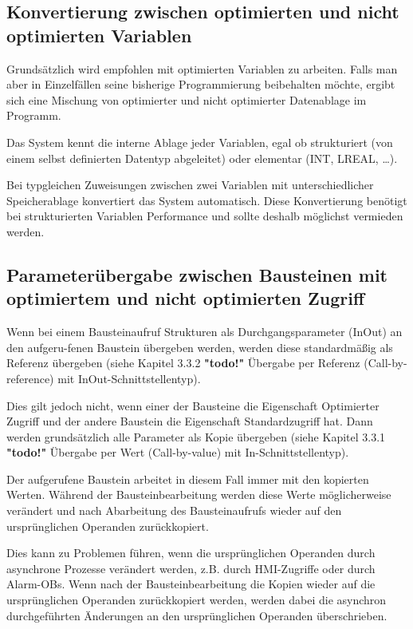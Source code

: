 \subsection{Konvertierung zwischen optimierten und nicht optimierten Variablen}\label{subsec:Konvertierung zwischen optimierten und nicht optimierten Variablen}
Grundsätzlich wird empfohlen mit optimierten Variablen zu arbeiten. Falls man aber in Einzelfällen seine bisherige Programmierung beibehalten möchte, ergibt sich eine Mischung von optimierter und nicht optimierter Datenablage im Programm. \par
Das System kennt die interne Ablage jeder Variablen, egal ob strukturiert (von einem selbst definierten Datentyp abgeleitet) oder elementar (INT, LREAL, …).\par 
Bei typgleichen Zuweisungen zwischen zwei Variablen mit unterschiedlicher Speicherablage konvertiert das System automatisch. Diese Konvertierung benötigt bei strukturierten Variablen Performance und sollte deshalb möglichst vermieden werden.

\subsection{Parameterübergabe zwischen Bausteinen mit optimiertem und nicht optimierten Zugriff}\label{subsec:Parameterübergabe zwischen Bausteinen mit optimiertem und nicht optimierten Zugriff}

Wenn bei einem Bausteinaufruf Strukturen als Durchgangsparameter (InOut) an den aufgeru-fenen Baustein übergeben werden, werden diese standardmäßig als Referenz übergeben (siehe Kapitel 3.3.2 \textbf{"todo!"} Übergabe per Referenz (Call-by-reference) mit InOut-Schnittstellentyp). \par
Dies gilt jedoch nicht, wenn einer der Bausteine die Eigenschaft \glqq Optimierter Zugriff\grqq{} und der andere Baustein die Eigenschaft \glqq Standardzugriff\grqq{} hat. Dann werden grundsätzlich alle Parameter als Kopie übergeben (siehe Kapitel 3.3.1 \textbf{"todo!"} Übergabe per Wert (Call-by-value) mit In-Schnittstellentyp). \par
Der aufgerufene Baustein arbeitet in diesem Fall immer mit den kopierten Werten. Während der Bausteinbearbeitung werden diese Werte möglicherweise verändert und nach Abarbeitung des Bausteinaufrufs wieder auf den ursprünglichen Operanden zurückkopiert. \par
Dies kann zu Problemen führen, wenn die ursprünglichen Operanden durch asynchrone Prozesse verändert werden, z.B. durch HMI-Zugriffe oder durch Alarm-OBs. Wenn nach der Bausteinbearbeitung die Kopien wieder auf die ursprünglichen Operanden zurückkopiert werden, werden dabei die asynchron durchgeführten Änderungen an den ursprünglichen Operanden überschrieben.

